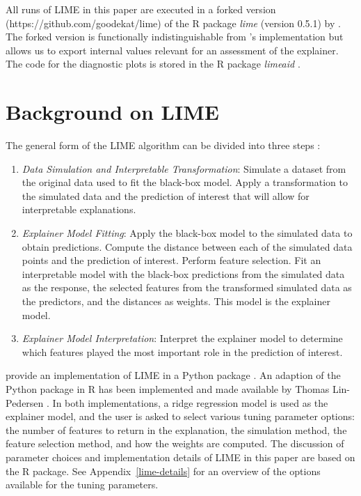 \documentclass[AMS,STIX2COL]{WileyNJD-v2}\usepackage[]{graphicx}\usepackage[]{color}
\begin{document}
All runs of LIME in this paper are executed in a forked version (https://github.com/goodekat/lime) of the R package \emph{lime} (version 0.5.1) by \citet{pedersen:2020}. The forked version is functionally indistinguishable from \citeauthor{pedersen:2020}'s implementation but allows us to export internal values relevant for an assessment of the explainer. The code for the diagnostic plots  is stored in  the R package \emph{limeaid} \citep{goode:2020}.

\section{Background on LIME} \label{background}

The general form of the LIME algorithm can be divided into three steps \citep[see also][]{laugel:2018}:

\begin{enumerate}

\item \emph{Data Simulation and Interpretable Transformation}: Simulate a dataset from the original data used to fit the black-box model. Apply a transformation to the simulated data and the prediction of interest that will allow for interpretable explanations.

\item \emph{Explainer Model Fitting}: Apply the black-box model to the simulated data to obtain predictions. Compute the distance between each of the simulated data points and the prediction of interest. Perform feature selection. Fit an interpretable model with the black-box predictions from the simulated data as the response, the selected features from the transformed simulated data as the predictors, and the distances as weights. This model is the explainer model.

\item \emph{Explainer Model Interpretation}: Interpret the explainer model to determine which features played the most important role in the prediction of interest.

\end{enumerate}

\citet{ribeiro:2016} provide an implementation of LIME in a Python package \cite{ribeiro:2020}. An adaption of the Python package in R has been implemented and made available by Thomas Lin-Pedersen \citep{pedersen:2020}. In both implementations, a ridge regression model is used as the explainer model, and  the user is asked to select various tuning parameter options: the number of features to return in the explanation, the simulation method, the feature selection method, and how the weights are computed. The discussion of parameter choices and implementation details of LIME in this paper are based on the R package. See Appendix~\ref{lime-details} for
an overview of the options available for the tuning parameters.
\end{document}
